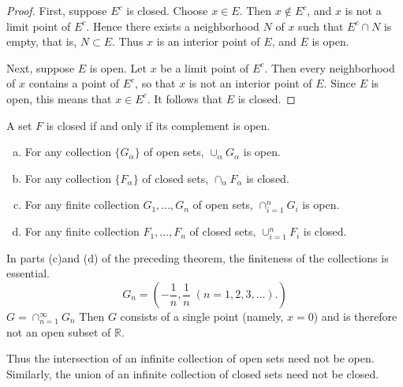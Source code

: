 \begin{proof}
    First, suppose $E^c$ is closed. Choose $x \in E$. Then $x \not\in E^c$, and $x$ is not a limit point of $E^c$. Hence there exists a neighborhood $N$ of $x$ such that $E^c \cap N$ is empty, that is, $N \subset E$. Thus $x$ is an interior point of $E$, and $E$ is open.
    
    Next, suppose $E$ is open. Let $x$ be a limit point of $E^c$. Then every neighborhood of $x$ contains a point of $E^c$, so that $x$ is not an interior point of $E$. Since $E$ is open, this means that $x \in E^c$. It follows that $E$ is closed.
\end{proof}

\begin{myCorollary}
    A set $F$ is closed if and only if its complement is open.
\end{myCorollary}


\begin{thm}
    \label{thm:2.24}
    \begin{enumerate}[(a)]
        \item For any collection $\{G_\alpha\}$ of open sets,  $\cup_\alpha G_\alpha$ is open.
        \item For any collection $\{F_\alpha\}$ of closed sets, $\cap_\alpha F_\alpha$ is closed.
        \item For any finite collection $G_1, ..., G_n$ of open sets, $\cap_{i=1}^n G_i$ is open.
        \item For any finite collection $F_1, ..., F_n$ of closed sets, $\cup_{i=1}^n F_i$ is closed.
    \end{enumerate}
\end{thm}



\begin{myExample}
    In parts (c)and (d) of the preceding theorem, the finiteness of the collections is essential.
    \begin{equation*}
        G_n = \left(-\frac{1}{n}, \frac{1}{n} \; (n=1,2,3,\dots). \right)
    \end{equation*}
    $G = \cap_{n=1}^\infty G_n$
    Then $G$ consists of a single point (namely, $x = 0$) and is therefore not an open subset of $\mathbb{R}$.
    
    Thus the intersection of an infinite collection of open sets need not be open. Similarly, the union of an infinite collection of closed sets need not be closed.
\end{myExample}

